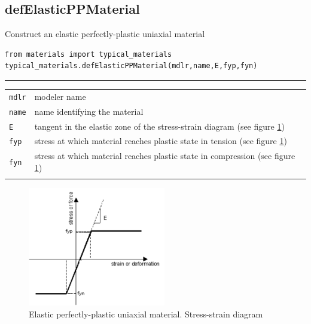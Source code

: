 \subsection{defElasticPPMaterial}
\noindent Construct an elastic perfectly-plastic uniaxial material
\begin{verbatim}
from materials import typical_materials
typical_materials.defElasticPPMaterial(mdlr,name,E,fyp,fyn)
\end{verbatim}
\vspace{-10pt}
{\color{grayLines} \rule{\linewidth}{0.25pt}}
\begin{center}
\begin{tabular}{lp{10cm}}
{\tt mdlr} & modeler name \\
{\tt name} & name identifying the material \\
{\tt E} & tangent in the elastic zone of the stress-strain diagram (see figure \ref{ElasticPP}) \\
{\tt fyp} & stress at which material reaches plastic state in tension (see figure \ref{ElasticPP}) \\
{\tt fyn} &  stress at which material reaches plastic state in compression (see figure \ref{ElasticPP}) \\
{\tt } &  \\
\end{tabular}
\end{center}

\begin{figure}[h]
\centering
\includegraphics[width=60mm]{materials/figures/ElasticPP}
\caption{Elastic perfectly-plastic uniaxial material. Stress-strain diagram}\label{ElasticPP}
\end{figure}

